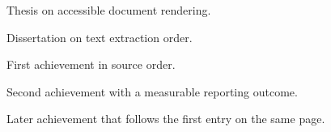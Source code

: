 \documentclass{careerdossier-resume}
\begin{document}
\MakeCDossierHeader
{}
\begin{CDossierEntry}[
  title        = {PhD, Physics},
  organization = {Example University},
  location     = {Toronto, ON},
  dates        = {2012--2016}
]
  \begin{CDossierItemize}
    \item Thesis on accessible document rendering.
  \end{CDossierItemize}
\end{CDossierEntry}
\begin{CDossierEntry}[
  title        = {MSc, Physics},
  organization = {Example Institute},
  location     = {Ottawa, ON},
  dates        = {2010--2012}
]
  \begin{CDossierItemize}
    \item Dissertation on text extraction order.
  \end{CDossierItemize}
\end{CDossierEntry}
\begin{CDossierEntry}[
  title        = {Senior Engineer},
  organization = {Example Labs},
  location     = {Toronto, ON},
  dates        = {2024--Present}
]
  \begin{CDossierItemize}
    \item First achievement in source order.
    \item Second achievement with a measurable reporting outcome.
  \end{CDossierItemize}
\end{CDossierEntry}
\begin{CDossierEntry}[
  title        = {Engineer},
  organization = {Example Services},
  location     = {Ottawa, ON},
  dates        = {2022--2024}
]
  \begin{CDossierItemize}
    \item Later achievement that follows the first entry on the same page.
  \end{CDossierItemize}
\end{CDossierEntry}
\end{document}
